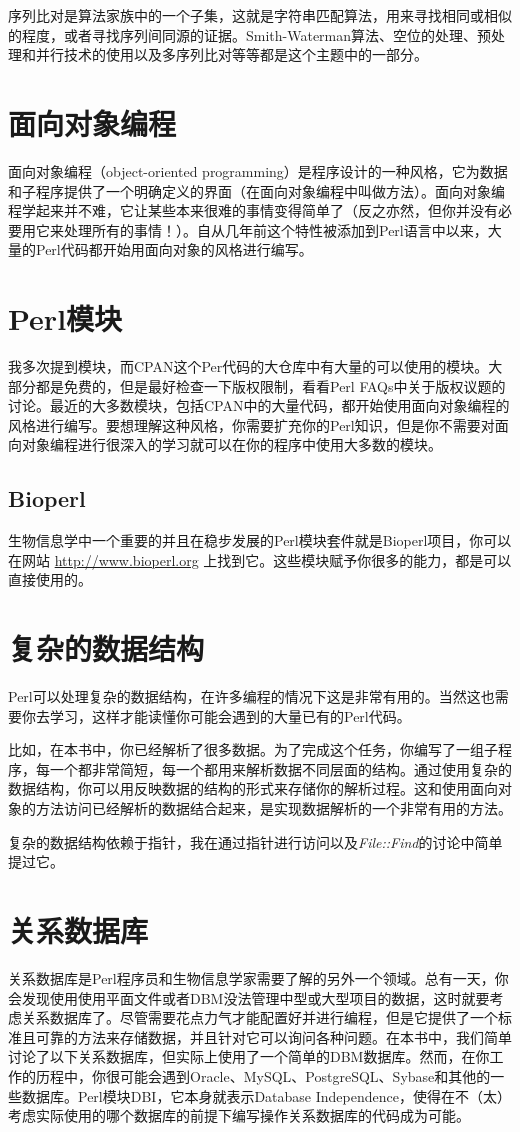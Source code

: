 序列比对是算法家族中的一个子集，这就是字符串匹配算法，用来寻找相同或相似的程度，或者寻找序列间同源的证据。Smith-Waterman算法、空位的处理、预处理和并行技术的使用以及多序列比对等等都是这个主题中的一部分。

\section{面向对象编程}
面向对象编程（object-oriented programming）是程序设计的一种风格，它为数据和子程序提供了一个明确定义的界面（在面向对象编程中叫做方法）。面向对象编程学起来并不难，它让某些本来很难的事情变得简单了（反之亦然，但你并没有必要用它来处理所有的事情！）。自从几年前这个特性被添加到Perl语言中以来，大量的Perl代码都开始用面向对象的风格进行编写。

\section{Perl模块}
我多次提到模块，而CPAN这个Per代码的大仓库中有大量的可以使用的模块。大部分都是免费的，但是最好检查一下版权限制，看看Perl FAQs中关于版权议题的讨论。最近的大多数模块，包括CPAN中的大量代码，都开始使用面向对象编程的风格进行编写。要想理解这种风格，你需要扩充你的Perl知识，但是你不需要对面向对象编程进行很深入的学习就可以在你的程序中使用大多数的模块。 

\subsection{Bioperl}
生物信息学中一个重要的并且在稳步发展的Perl模块套件就是Bioperl项目，你可以在网站 \href{http://www.bioperl.org}{http://www.bioperl.org} 上找到它。这些模块赋予你很多的能力，都是可以直接使用的。

\section{复杂的数据结构}
Perl可以处理复杂的数据结构，在许多编程的情况下这是非常有用的。当然这也需要你去学习，这样才能读懂你可能会遇到的大量已有的Perl代码。

比如，在本书中，你已经解析了很多数据。为了完成这个任务，你编写了一组子程序，每一个都非常简短，每一个都用来解析数据不同层面的结构。通过使用复杂的数据结构，你可以用反映数据的结构的形式来存储你的解析过程。这和使用面向对象的方法访问已经解析的数据结合起来，是实现数据解析的一个非常有用的方法。

复杂的数据结构依赖于指针，我在通过指针进行访问以及\textit{File::Find}的讨论中简单提过它。

\section{关系数据库}
关系数据库是Perl程序员和生物信息学家需要了解的另外一个领域。总有一天，你会发现使用使用平面文件或者DBM没法管理中型或大型项目的数据，这时就要考虑关系数据库了。尽管需要花点力气才能配置好并进行编程，但是它提供了一个标准且可靠的方法来存储数据，并且针对它可以询问各种问题。在本书中，我们简单讨论了以下关系数据库，但实际上使用了一个简单的DBM数据库。然而，在你工作的历程中，你很可能会遇到Oracle、MySQL、PostgreSQL、Sybase和其他的一些数据库。Perl模块DBI，它本身就表示Database Independence，使得在不（太）考虑实际使用的哪个数据库的前提下编写操作关系数据库的代码成为可能。

